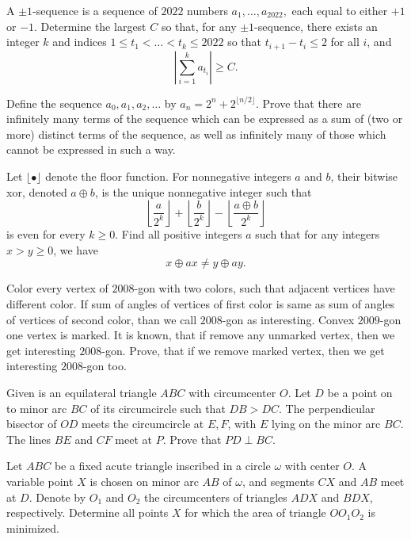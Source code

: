 \documentclass[11pt]{scrartcl}
\begin{document}
\begin{problem}[7948249970111159954]
	A $\pm 1$-sequence is a sequence of $2022$ numbers $a_1, \ldots, a_{2022},$ each equal to either $+1$ or $-1$. Determine the largest $C$ so that, for any $\pm 1$-sequence, there exists an integer $k$ and indices $1 \le t_1 < \ldots < t_k \le 2022$ so that $t_{i+1} - t_i \le 2$ for all $i$, and$$\left| \sum_{i = 1}^{k} a_{t_i} \right| \ge C.$$
\end{problem}
\begin{problem}[8609709793627283757]
	Define the sequence $a_0,a_1,a_2,\hdots$ by $a_n=2^n+2^{\lfloor n/2\rfloor}$. Prove that there are infinitely many terms of the sequence which can be expressed as a sum of (two or more) distinct terms of the sequence, as well as infinitely many of those which cannot be expressed in such a way.
\end{problem}
\begin{problem}[3780160396229984886]
	Let $\lfloor \bullet \rfloor$ denote the floor function. For nonnegative integers $a$ and $b$, their bitwise xor, denoted $a \oplus b$, is the unique nonnegative integer such that$$ \left \lfloor \frac{a}{2^k}  \right \rfloor+ \left\lfloor\frac{b}{2^k} \right\rfloor - \left\lfloor \frac{a\oplus b}{2^k}\right\rfloor$$is even for every $k \ge 0$. Find all positive integers $a$ such that for any integers $x>y\ge 0$, we have\[ x\oplus ax \neq y \oplus ay. \]
\end{problem}
\begin{problem}[8757490679465390171]
	Color every vertex of $2008$-gon with two colors, such that adjacent vertices have different color. If sum of angles of vertices of first color is same as sum of angles of vertices of second color, than we call $2008$-gon as interesting.
Convex $2009$-gon one vertex is marked. It is known, that if remove any unmarked vertex, then we get interesting $2008$-gon. Prove, that if we remove marked vertex, then we get interesting $2008$-gon too.
\end{problem}
\begin{problem}[255403454348745096]
	Given is an equilateral triangle $ABC$ with circumcenter $O$. Let $D$ be a point on to minor arc $BC$ of its circumcircle such that $DB>DC$. The perpendicular bisector of $OD$ meets the circumcircle at $E, F$, with $E$ lying on the minor arc $BC$. The lines $BE$ and $CF$ meet at $P$. Prove that $PD \perp BC$.
\end{problem}
\begin{problem}[213513857758059]
Let $ABC$ be a fixed acute triangle inscribed in a circle $\omega$ with center $O$. A variable point $X$ is chosen on minor arc $AB$ of $\omega$, and segments $CX$ and $AB$ meet at $D$. Denote by $O_1$ and $O_2$ the circumcenters of triangles $ADX$ and $BDX$, respectively. Determine all points $X$ for which the area of triangle $OO_1O_2$ is minimized.
\end{problem}
\end{document}
